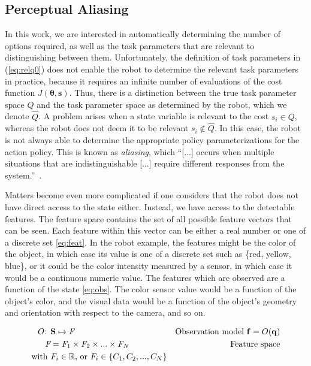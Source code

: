 \documentclass[12pt]{article}
\newcommand{\mymath}[1]{\ensuremath{#1}\xspace}
\newcommand{\sta}    {\mymath{\mathbf{s}}}
\newcommand{\stasp}  {\mymath{\mathbf{S}}}
\newcommand{\app}    {\mymath{\bm{\theta}}}
\newcommand{\taskp}  {\mymath{\mathbf{q}}}
\newcommand{\taskpsp}{\mymath{Q}}
\newcommand{\feat}   {\mymath{f}}
\newcommand{\featv}  {\mymath{\mathbf{f}}}
\newcommand{\featsp} {\mymath{\emph{F}}}
\newcommand{\obsm}   {\mymath{O}}
\begin{document}
\subsection{Perceptual Aliasing}

In this work, we are interested in automatically determining the number of options required, as well as the task parameters that are relevant to distinguishing between them. Unfortunately, the definition of task parameters in (\ref{eq:relq0}) does not enable the robot to determine the relevant task parameters in practice, because it requires an infinite number of evaluations of the cost function $J(\app,\sta)$. 
Thus, there is a distinction between the true task parameter space \taskpsp and the task parameter space as determined by the robot, which we denote $\hat{\taskpsp}$.
A problem arises when a state variable is relevant to the cost $s_i \in \taskpsp$, whereas the robot does not deem it to be relevant $s_i \notin \hat{\taskpsp}$. In this case, the robot is not always able to determine the appropriate policy parameterizations for the action policy. This is known as \emph{aliasing}, which 
``[$\dots$] occurs when multiple situations that are indistinguishable [$\dots$] require different responses from the system.''~\cite{chrisman92reinforcement}.

Matters become even more complicated if one considers that the robot does not have direct access to the state either. Instead, we have access to the detectable features.  The feature space contains the set of all possible feature vectors that can be seen. Each feature within this vector can be either a real number or one of a discrete set \eqref{eq:feat}. In the robot example, the features might be the color of the object, in which case its value is one of a discrete set such as \{red, yellow, blue\}, or it could be the color intensity measured by a sensor, in which case it would be a continuous numeric value. The features which are observed are a function of the state \eqref{eq:obs}. The color sensor value would be a function of the object's color, and the visual data would be a function of the object's geometry and orientation with respect to the camera, and so on.

\begin{align}
\obsm\mbox{: } &\label{eq:obs}\stasp \mapsto \featsp& \mbox{Observation model~} \featv=\obsm(\taskp)\\
\label{eq:feat}\featsp &= \featsp_1 \times \featsp_2 \times ... \times \featsp_N & \mbox{Feature space}\\
\mbox{with~} &\featsp_i \in \mathbb{R}\mbox{, or~} \featsp_i \in \{C_1,C_2,...,C_N\}&\notag%
\end{align}
\end{document}
